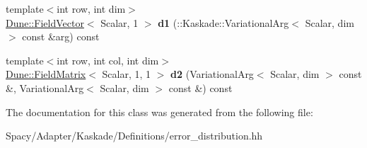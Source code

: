 \begin{DoxyCompactItemize}
\item 
\hypertarget{classSpacy_1_1Kaskade_1_1ErrorDistribution_1_1BoundaryCache_ab9fb20268e8a31c94fc7745f7524b4dc}{}{\footnotesize template$<$int row, int dim$>$ }\\\hyperlink{classDune_1_1FieldVector}{Dune\+::\+Field\+Vector}$<$ Scalar, 1 $>$ {\bfseries d1} (\+::Kaskade\+::\+Variational\+Arg$<$ Scalar, dim $>$ const \&arg) const \label{classSpacy_1_1Kaskade_1_1ErrorDistribution_1_1BoundaryCache_ab9fb20268e8a31c94fc7745f7524b4dc}

\item 
\hypertarget{classSpacy_1_1Kaskade_1_1ErrorDistribution_1_1BoundaryCache_a02f8459dd4b6dfdac24d4090fcc0362e}{}{\footnotesize template$<$int row, int col, int dim$>$ }\\\hyperlink{classDune_1_1FieldMatrix}{Dune\+::\+Field\+Matrix}$<$ Scalar, 1, 1 $>$ {\bfseries d2} (Variational\+Arg$<$ Scalar, dim $>$ const \&, Variational\+Arg$<$ Scalar, dim $>$ const \&) const \label{classSpacy_1_1Kaskade_1_1ErrorDistribution_1_1BoundaryCache_a02f8459dd4b6dfdac24d4090fcc0362e}

\end{DoxyCompactItemize}


The documentation for this class was generated from the following file\+:\begin{DoxyCompactItemize}
\item 
Spacy/\+Adapter/\+Kaskade/\+Definitions/error\+\_\+distribution.\+hh\end{DoxyCompactItemize}
